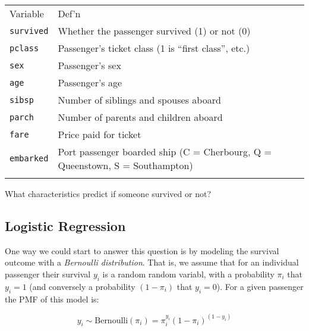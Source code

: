 \documentclass[
]{article}
\newenvironment{Shaded}{\begin{snugshade}}{\end{snugshade}}
\newcommand{\NormalTok}[1]{#1}
\newcommand{\SpecialCharTok}[1]{\textcolor[rgb]{0.00,0.00,0.00}{#1}}
\begin{document}
\begin{Shaded}
\end{Shaded}

\begin{longtable}[]{@{}
  >{\raggedleft\arraybackslash}p{}
  >{\raggedright\arraybackslash}p{}@{}}
\toprule
Variable & Def'n \\ \addlinespace
\midrule
\endhead
\texttt{survived} & Whether the passenger survived (1) or not
(0) \\ \addlinespace
\texttt{pclass} & Passenger's ticket class (1 is ``first class'',
etc.) \\ \addlinespace
\texttt{sex} & Passenger's sex \\ \addlinespace
\texttt{age} & Passenger's age \\ \addlinespace
\texttt{sibsp} & Number of siblings and spouses aboard \\ \addlinespace
\texttt{parch} & Number of parents and children aboard \\ \addlinespace
\texttt{fare} & Price paid for ticket \\ \addlinespace
\texttt{embarked} & Port passenger boarded ship (C = Cherbourg, Q =
Queenstown, S = Southampton) \\ \addlinespace
\bottomrule
\end{longtable}

What characteristics predict if someone survived or not?

\hypertarget{logistic-regression}{%
\subsection{Logistic Regression}\label{logistic-regression}}

One way we could start to answer this question is by modeling the
survival outcome with a \emph{Bernoulli distribution}. That is, we
assume that for an individual passenger their survival \(y_i\) is a
random random variabl, with a probability \(\pi_i\) that \(y_i=1\) (and
conversely a probability \((1-\pi_i)\) that \(y_i=0\)). For a given
passenger the PMF of this model is:

\[
y_i \sim \text{Bernoulli}(\pi_i) = \pi_i^{y_i} (1-\pi_i)^{(1-y_i)}
\]
\end{document}
